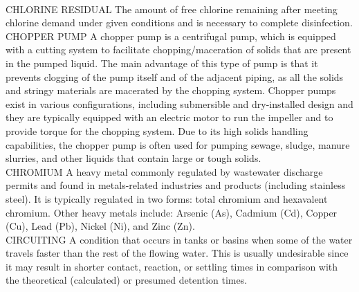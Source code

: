 \documentclass{article}
\begin{document}
\vspace{0.3cm}\\
CHLORINE RESIDUAL
The amount of free chlorine remaining after meeting chlorine demand under given conditions and is necessary to complete disinfection.
\vspace{0.3cm}\\
CHOPPER PUMP
A chopper pump is a centrifugal pump, which is equipped with a cutting system to facilitate chopping/maceration of solids that are present in the pumped liquid. The main advantage of this type of pump is that it prevents clogging of the pump itself and of the adjacent piping, as all the solids and stringy materials are macerated by the chopping system. Chopper pumps exist in various configurations, including submersible and dry-installed design and they are typically equipped with an electric motor to run the impeller and to provide torque for the chopping system. Due to its high solids handling capabilities, the chopper pump is often used for pumping sewage, sludge, manure slurries, and other liquids that contain large or tough solids.
\vspace{0.3cm}\\
CHROMIUM
A heavy metal commonly regulated by wastewater discharge permits and found in metals-related industries and products (including stainless steel). It is typically regulated in two forms: total chromium and hexavalent chromium. Other heavy metals include: Arsenic (As), Cadmium (Cd), Copper (Cu), Lead (Pb), Nickel (Ni), and Zinc (Zn).
\vspace{0.3cm}\\
CIRCUITING
A condition that occurs in tanks or basins when some of the water travels faster than the rest of the flowing water. This is usually undesirable since it may result in shorter contact, reaction, or settling times in comparison with the theoretical (calculated) or presumed detention times.
\vspace{0.3cm}\\
\end{document}
